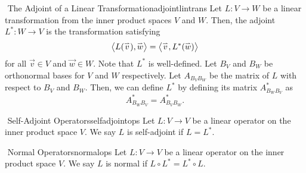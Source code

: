         \begin{definition}{\Stop\,\,The Adjoint of a Linear Transformation}{adjointlintrans}
            Let \(L:V\to W\) be a linear transformation from the inner product spaces \(V\) and \(W\). Then, the adjoint \(L^*:W\to V\) is the transformation satisfying
            \begin{equation*}
                \left\langle L(\overset{_{\rightharpoonup}}{v}),\overset{_{\rightharpoonup}}{w}\right\rangle=\left\langle \overset{_{\rightharpoonup}}{v},L^*(\overset{_{\rightharpoonup}}{w})\right\rangle
            \end{equation*}
            for all \(\vec{v}\in V\) and \(\vec{w}\in W\). Note that \(L^*\) is well-defined. Let \(B_V\) and \(B_W\) be orthonormal bases for \(V\) and \(W\) respectively. Let \(A_{B_VB_W}\) be the matrix of \(L\) with respect to \(B_V\) and \(B_W\). Then, we can define \(L^*\) by defining its matrix \(A^*_{B_WB_V}\) as
            \begin{equation*}
                A^*_{B_WB_V}=A_{B_VB_W}^*.
            \end{equation*}
        \end{definition}
        \begin{definition}{\Stop\,\,Self-Adjoint Operators}{selfadjointops}
            Let \(L:V\to V\) be a linear operator on the inner product space \(V\). We say \(L\) is self-adjoint if \(L=L^*\).
        \end{definition}
        \begin{definition}{\Stop\,\,Normal Operators}{normalops}
            Let \(L:V\to V\) be a linear operator on the inner product space \(V\). We say \(L\) is normal if \(L\circ L^*=L^*\circ L\).
        \end{definition}
